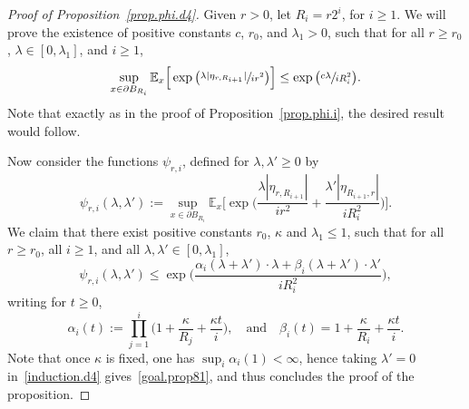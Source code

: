 \documentclass[JEP,XML,SOM,Unicode,NoFloatCountersInSection,published]{cedram}
\theoremstyle{plain}
\theoremstyle{definition}
\newcommand{\1}{{\text{\Large $\mathfrak 1$}}}
\begin{document}
\begin{proof}[Proof of Proposition~\ref{prop.phi.d4}]
Given $r>0$, let $R_i = r2^i$, for $i\ge 1$. We will prove the existence of positive constants
$c$, $r_0$, and $\lambda_1>0$, such that for all $r\ge r_0$, $\lambda\in[0,\lambda_1]$, and $i\ge 1$,
\begin{equation}\label{goal.prop81}
\sup_{x\in \partial B_{R_i}}\mathbb E_x\Big[\exp\big(\sfrac{\lambda |\eta_{r,R_{i+1}}|}{ir^2}\big)\Big] \le \exp\big(\sfrac{c\lambda}{iR_i^2}\big).
\end{equation}
Note that exactly as in the proof of Proposition~\ref{prop.phi.i}, the desired result would follow.

Now consider the functions $\psi_{r,i}$, defined for $\lambda,\lambda'\ge 0$ by
\[
\psi_{r,i}(\lambda,\lambda'):= \sup_{x\in \partial B_{R_i}}\mathbb E_x\Big[\exp\Big(\frac{\lambda |\eta_{r,R_{i+1}}|}{ir^2}+\frac{\lambda' |\eta_{R_{i+1},r}|}{iR_i^2}\Big)\Big].
\]
We claim that there exist positive constants $r_0$, $\kappa$ and $\lambda_1\le 1$, such that for all $r\ge r_0$, all $i\ge 1$, and all $\lambda, \lambda'\in[0,\lambda_1]$,
\begin{equation}\label{induction.d4}
\psi_{r,i}(\lambda,\lambda') \le \exp\Big(\frac{\alpha_i(\lambda+\lambda')\cdot \lambda+\beta_i(\lambda+\lambda')\cdot\lambda'}{iR_i^2}\Big),
\end{equation}
writing for $t\ge 0$,
\[
\alpha_i(t) := \prod_{j=1}^i\Big(1+\frac{\kappa }{R_j}+\frac {\kappa t} i\Big), \quad \text{and}\quad \beta_i(t)=1+\frac{\kappa }{R_i}+\frac{\kappa t}{i}.
\]
Note that once $\kappa$ is fixed, one has $\sup_i \alpha_i(1)<\infty$, hence taking $ \lambda'=0$ in~\eqref{induction.d4} gives~\eqref{goal.prop81}, and thus concludes the proof of the proposition.


\end{proof}
\end{document}
